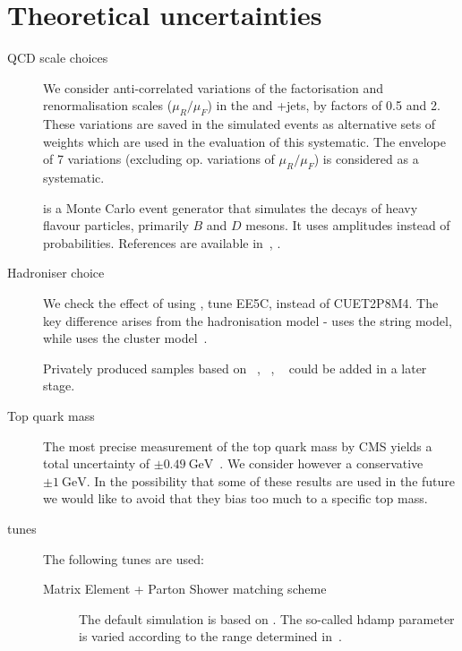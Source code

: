 \section{Theoretical uncertainties}
\begin{description}

\item[QCD scale choices]
  We consider anti-correlated variations of the factorisation and renormalisation scales ($\mu_R/\mu_F$) in the \ttbar and \PW+jets, by factors of 0.5 and 2. These variations are saved in the simulated events as alternative sets of weights which are used in the evaluation of this systematic. The envelope of 7 variations (excluding op. variations of $\mu_R/\mu_F$) is considered as a systematic.

\item[\EVTGEN] \EVTGEN is a Monte Carlo event generator that simulates the decays of heavy flavour particles, primarily $B$ and $D$ mesons. It uses amplitudes instead of probabilities. References are available in~\cite{evtgen}, \cite{Lange:2001uf}.

\item[Hadroniser choice] We check the effect of using \HERWIGpp \cite{Bahr:2008pv}, tune EE5C\cite{Seymour:2013qka}, instead of  CUET2P8M4. The key difference arises from the hadronisation model - \PYTHIA uses the string model, while \HERWIGpp uses the cluster model~\cite{Sjostrand:hadronisation}. 

  Privately produced samples based on \SHERPA~\cite{Gleisberg:2008ta}, \DIRE~\cite{Hoche:2015sya}, ~\cite{Bellm:2015jjp} could be added in a later stage.

\item[Top quark mass] The most precise measurement of the top quark mass by CMS yields a total uncertainty of $\pm0.49~\text{GeV}$~\cite{Khachatryan:2015hba}. We consider however a conservative $\pm1~\text{GeV}$. In the possibility that some of these results are used in the future we would like to avoid that they bias too much to a specific top mass.

\item[\PYTHIA tunes] The following \PYTHIA tunes are used:
  
  \begin{description}
    
  \item[Matrix Element + Parton Shower matching scheme] The default simulation is based on \POWHEG. The so-called hdamp parameter is varied according to the range determined in~\cite{CMS-PAS-TOP-13-007}.


\end{description}
\end{description}
